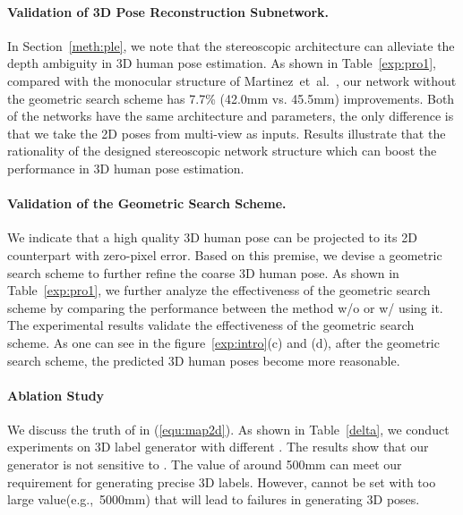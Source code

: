 \documentclass[10pt,twocolumn,letterpaper]{article}
\def\eg{e.g.,~}
\def\etal{et~al.\xspace}
\begin{document}
\paragraph{Validation of 3D Pose Reconstruction Subnetwork.}\vspace{-3mm}
In Section~\ref{meth:ple}, we note that the stereoscopic architecture can alleviate the depth ambiguity in 3D human pose estimation.
As shown in Table~\ref{exp:pro1}, compared with the monocular structure of Martinez~\etal~\cite{martinez2017simple}, our network without the geometric search scheme has 7.7\% (42.0mm vs. 45.5mm) improvements.
Both of the networks have the same architecture and parameters, the only difference is that we take the 2D poses from multi-view as inputs.
Results illustrate that the rationality of the designed stereoscopic network structure which can boost the performance in 3D human pose estimation.


\paragraph{Validation of the Geometric Search Scheme.}\vspace{-3mm}
We indicate that a high quality 3D human pose can be projected to its 2D counterpart with zero-pixel error.
Based on this premise, we devise a geometric search scheme to further refine the coarse 3D human pose.
As shown in Table~\ref{exp:pro1}, we further analyze the effectiveness of the geometric search scheme by comparing the performance between the method w/o or w/ using it.
The experimental results validate the effectiveness of the geometric search scheme.
As one can see in the figure~\ref{exp:intro}(c) and (d), after the geometric search scheme, the predicted 3D human poses become more reasonable.




\paragraph{Ablation Study}\vspace{-3mm}
We discuss the truth of  in (\ref{equ:map2d}). As shown in Table~\ref{delta}, we conduct experiments on 3D label generator with different . The results show that our generator is not sensitive to . The value of  around 500mm can meet our requirement for generating precise 3D labels. However,  cannot be set with too large value(\eg 5000mm) that will lead to failures in generating 3D poses.
\end{document}
